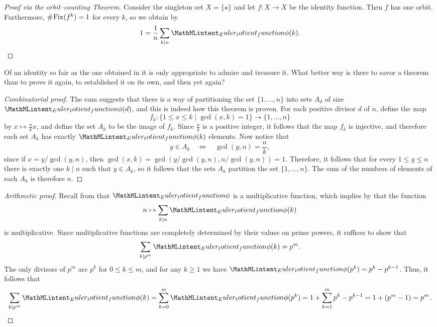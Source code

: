 \begin{proof}[Proof via the orbit--counting Theorem]
  Consider the singleton set $X=\{\star\}$ and let $f:X\to X$ be the identity function. Then $f$ has one orbit. Furthermore, $\mathord{\#}\mkern1mu \mathrm{Fix}(f^k)=1$ for every $k$, so we obtain by 
  \begin{equation*}
    1=\frac{1}{n}\sum_{k\mid n}\totient(k).\qedhere
  \end{equation*}
\end{proof}

Of an identity so fair as the one obtained in  it is only appropriate to admire and treasure it. What better way is there to savor a theorem than to prove it again, to established it on its own, and then yet again?

\begin{proof}[Combinatorial proof]
  The sum suggests that there is a way of partitioning the set $\{1,\ldots,n\}$ into sets $A_d$ of size $\totient(d)$, and this is indeed how this theorem is proven. For each positive divisor $d$ of $n$, define the map
  \begin{equation*}
    f_k:{\textstyle \{1\leq x\leq  k \mid \gcd(x,k) = 1\}} \to \{1,\ldots,n\}
  \end{equation*}
  by $x\mapsto \frac{n}{k}x$, and define the set $A_k$ to be the image of $f_k$. Since $\frac{n}{k}$ is a positive integer, it follows that the map $f_k$ is injective, and therefore each set $A_k$ has exactly $\totient(k)$ elements. Now notice that
  \begin{equation*}
    y\in A_k \quad\Leftrightarrow\quad \gcd(y,n)=\frac{n}{k},
  \end{equation*}
  since if $x=y/\gcd(y,n)$, then $\gcd(x,k)=\gcd(y/\gcd(y,n),n/\gcd(y,n))=1$.
  Therefore, it follows that for every $1\leq y\leq n$ there is exactly one $k\mid n$ such that $y\in A_k$, so it follows that the sets $A_k$ partition the set $\{1,\ldots,n\}$. The sum of the numbers of elements of each $A_k$ is therefore $n$.
\end{proof}

\begin{proof}[Arithmetic proof]
  Recall from  that $\totient$ is a multiplicative function, which implies by  that the function
  \begin{equation*}
    n\mapsto \sum_{k\mid n}\totient(k)
  \end{equation*}
  is multiplicative. Since multiplicative functions are completely determined by their values on prime powers, it suffices to show that
  \begin{equation*}
    \sum_{k\mid p^m}\totient(k)=p^m.
  \end{equation*}
  The only divisors of $p^m$ are $p^k$ for $0\leq k\leq m$, and for any $k\geq 1$ we have $\totient(p^k)=p^k-p^{k-1}$. Thus, it follows that
  \begin{equation*}
    \sum_{k\mid p^m}\totient(k) = \sum_{k=0}^m\totient(p^k)= 1+\sum_{k=1}^m p^k-p^{k-1}=1+(p^m-1)=p^m.\qedhere
  \end{equation*}
\end{proof}

